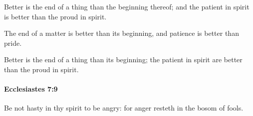 			\begin{versebox}
					\item[BHS] 
					\item[LXX] 
					\item[ASV] Better is the end of a thing than the beginning thereof; and the patient in spirit is better than the proud in spirit.
					\item[NIV] The end of a matter is better than its beginning, and patience is better than pride.
					\item[NRSV] Better is the end of a thing than its beginning; the patient in spirit are better than the proud in spirit.
			\end{versebox}

		\paragraph{Ecclesiastes 7:9} %
			\label{ECCLESIASTES-7-9}

			Be not hasty in thy spirit to be angry: for anger resteth in the bosom of fools.

